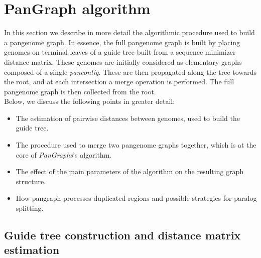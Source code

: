 \documentclass[aps,rmp,reprint,superscriptaddress,notitlepage,10pt,onecolumn]{revtex4-1}
\begin{document}
\section{PanGraph algorithm}
\label{sec:pangraph-algo}

In this section we describe in more detail the algorithmic procedure used to build a pangenome graph. In essence, the full pangenome graph is built by placing genomes on terminal leaves of a guide tree built from a sequence minimizer distance matrix. These genomes are initially considered as elementary graphs composed of a single \textit{pancontig}. These are then propagated along the tree towards the root, and at each intersection a merge operation is performed. The full pangenome graph is then collected from the root.\\

Below, we discuss the following points in greater detail:
\begin{itemize}
    \item The estimation of pairwise distances between genomes, used to build the guide tree.
    \item The procedure used to merge two pangenome graphs together, which is at the core of \textit{PanGraphs}'s algorithm.
    \item The effect of the main parameters of the algorithm on the resulting graph structure.
    \item How pangraph processes duplicated regions and possible strategies for paralog splitting.
\end{itemize}

\subsection{Guide tree construction and distance matrix estimation}
\end{document}
